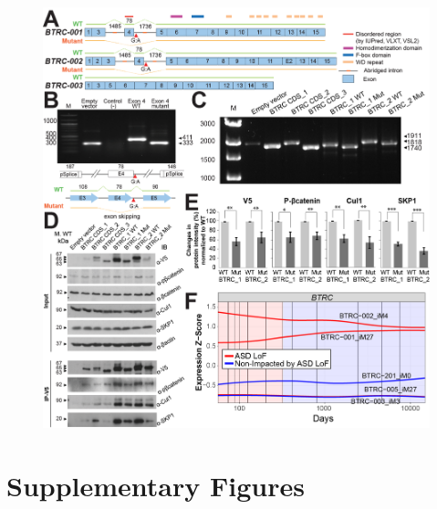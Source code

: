\documentclass[12pt,chapterheads,final]{ucsd}
\begin{document}
\begin{figure}[h]
  \centering
  \includegraphics[width=\textwidth]{figure5}
\end{figure}

\chapter{Supplementary Figures}
\clearpage
\end{document}
